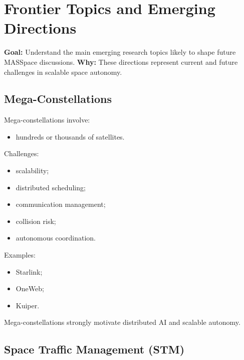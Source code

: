 \documentclass[10pt,a4paper,twocolumn]{article}
\newcommand{\lesson}[3]{
\section{#1}
\noindent
\textbf{Goal:} #2 \newline
\textbf{Why:} #3
\vspace{0.1em}
}
\begin{document}


\lesson
{Frontier Topics and Emerging Directions}
{Understand the main emerging research topics likely to shape future MASSpace discussions.}
{These directions represent current and future challenges in scalable space autonomy.}


\subsection{Mega-Constellations}

Mega-constellations involve:
\begin{itemize}
    \item hundreds or thousands of satellites.
\end{itemize}

Challenges:
\begin{itemize}
    \item scalability;
    \item distributed scheduling;
    \item communication management;
    \item collision risk;
    \item autonomous coordination.
\end{itemize}

Examples:
\begin{itemize}
    \item Starlink;
    \item OneWeb;
    \item Kuiper.
\end{itemize}

\begin{keybox}
    Mega-constellations strongly motivate distributed AI and scalable autonomy.
\end{keybox}


\subsection{Space Traffic Management (STM)}
\end{document}
